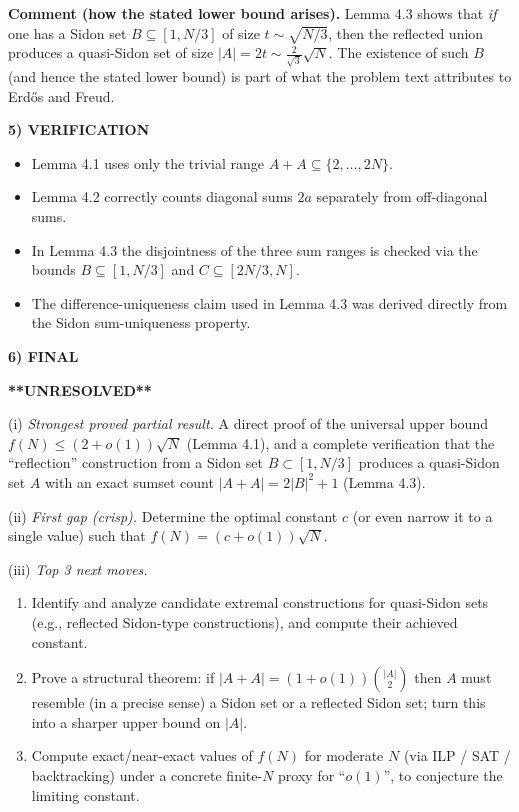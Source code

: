 \medskip
\noindent\textbf{Comment (how the stated lower bound arises).}
Lemma 4.3 shows that 
\emph{if} one has a Sidon set $B\subseteq[1,N/3]$ of size $t\sim \sqrt{N/3}$, then the reflected union produces a quasi-Sidon set of size $|A|=2t\sim \frac{2}{\sqrt3}\sqrt N$.
The existence of such $B$ (and hence the stated lower bound) is part of what the problem text attributes to Erd\H{o}s and Freud.

\medskip
\noindent\textbf{5) VERIFICATION}

\begin{itemize}
\item Lemma 4.1 uses only the trivial range $A+A\subseteq\{2,\dots,2N\}$.
\item Lemma 4.2 correctly counts diagonal sums $2a$ separately from off-diagonal sums.
\item In Lemma 4.3 the disjointness of the three sum ranges is checked via the bounds $B\subseteq[1,N/3]$ and $C\subseteq[2N/3,N]$.
\item The difference-uniqueness claim used in Lemma 4.3 was derived directly from the Sidon sum-uniqueness property.
\end{itemize}

\medskip
\noindent\textbf{6) FINAL}

\textbf{**UNRESOLVED**}

(i) \emph{Strongest proved partial result.} A direct proof of the universal upper bound $f(N)\le (2+o(1))\sqrt N$ (Lemma 4.1), and a complete verification that the ``reflection'' construction from a Sidon set $B\subset[1,N/3]$ produces a quasi-Sidon set $A$ with an exact sumset count $|A+A|=2|B|^2+1$ (Lemma 4.3).

(ii) \emph{First gap (crisp).} Determine the optimal constant $c$ (or even narrow it to a single value) such that $f(N)=(c+o(1))\sqrt N$.

(iii) \emph{Top 3 next moves.}
\begin{enumerate}
\item Identify and analyze candidate extremal constructions for quasi-Sidon sets (e.g., reflected Sidon-type constructions), and compute their achieved constant.
\item Prove a structural theorem: if $|A+A|=(1+o(1))\binom{|A|}{2}$ then $A$ must resemble (in a precise sense) a Sidon set or a reflected Sidon set; turn this into a sharper upper bound on $|A|$.
\item Compute exact/near-exact values of $f(N)$ for moderate $N$ (via ILP / SAT / backtracking) under a concrete finite-$N$ proxy for ``$o(1)$'', to conjecture the limiting constant.
\end{enumerate}

